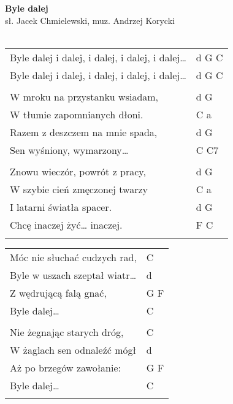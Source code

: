 \documentclass[a5paper]{article}
\begin{document}


\noindent
\fontsize{12pt}{15pt}\selectfont
\textbf{Byle dalej} \\
\fontsize{8pt}{10pt}\selectfont
sł. Jacek Chmielewski, muz. Andrzej Korycki \\ \\
\fontsize{10pt}{12pt}\selectfont
{}
\begin{tabular}{@{}p{8.5cm}p{3cm}@{}}
\noindent
Byle dalej i dalej, i dalej, i dalej, i dalej…  &d G C \\
Byle dalej i dalej, i dalej, i dalej, i dalej…  &d G C \\ \\

W mroku na przystanku wsiadam, & d G \\
W tłumie zapomnianych dłoni. & C a \\
Razem z deszczem na mnie spada, & d G \\
Sen wyśniony, wymarzony… & C C7 \\ \\

Znowu wieczór, powrót z pracy, & d G \\
W szybie cień zmęczonej twarzy & C a \\
I latarni światła spacer. & d G \\
Chcę inaczej żyć… inaczej. & F C \\\\
\end{tabular}

\noindent
\begin{tabular}{@{}p{7.5cm}p{3cm}@{}}
Móc nie słuchać cudzych rad, & C \\
Byle w uszach szeptał wiatr… & d \\
Z wędrującą falą gnać, & G F \\
Byle dalej… & C \\\\

Nie żegnając starych dróg, & C \\
W żaglach sen odnaleźć mógł & d \\
Aż po brzegów zawołanie: & G F \\
Byle dalej… & C \\\\
\end{tabular}
\end{document}
